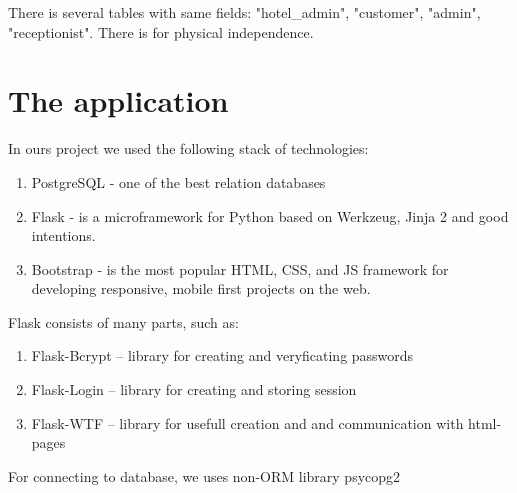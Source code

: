 \documentclass{sig-alternate-05-2015}
\begin{document}
There is several tables with same fields: "hotel\_admin", "customer", "admin", "receptionist". There is for physical independence. 



\section{The application}
In ours project we used the following stack of technologies:
\begin{enumerate}
	\item PostgreSQL - one of the best relation databases
	\item Flask - is a microframework for Python based on Werkzeug, Jinja 2 and good intentions. 
	\item Bootstrap - is the most popular HTML, CSS, and JS framework for developing responsive, mobile first projects on the web.
\end{enumerate}

Flask consists of many parts, such as:
\begin{enumerate}
	\item Flask-Bcrypt -- library for creating and veryficating passwords
	\item Flask-Login -- library for creating and storing session
	\item Flask-WTF -- library for usefull creation and and communication with html-pages
\end{enumerate}

For connecting to database, we uses non-ORM library psycopg2
\end{document}
